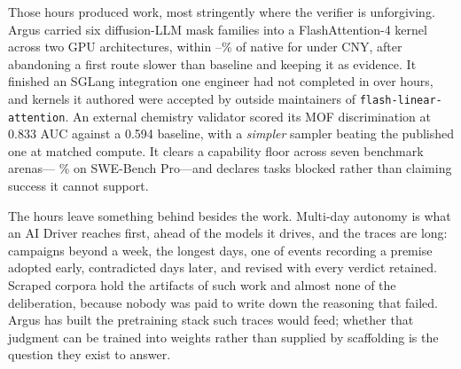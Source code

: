 \documentclass[10pt,letterpaper]{article}
\newcommand{\systemname}{Argus\xspace}
\newcommand{\code}[1]{\texttt{\small #1}}
\begin{document}
\begin{abstractbox}
Those hours produced work, most stringently where the verifier is unforgiving.
\systemname{} carried six diffusion-LLM mask families into a FlashAttention-4 kernel
across two GPU architectures, within \FlashDAGapLow--\FlashDAGapHigh\% of native for
under \FlashDACostCNY{} CNY, after abandoning a first route slower than baseline and
keeping it as evidence. It finished an SGLang integration one engineer had not
completed in over \SGLangHumanHours{} hours, and \FLAPRTotal{} kernels it authored
were accepted by outside maintainers of \code{flash-linear-attention}. An external
chemistry validator scored its MOF discrimination at 0.833 AUC against a 0.594
baseline, with a \emph{simpler} sampler beating the published one at matched
compute. It clears a capability floor across seven benchmark arenas---%
\SWEProArgusAccuracy\% on SWE-Bench Pro---and declares \ReviewerFirstBlocked{} tasks
blocked rather than claiming success it cannot support.

The hours leave something behind besides the work. Multi-day autonomy is what an AI
Driver reaches first, ahead of the models it drives, and the traces are long:
\CampaignsOverWeek{} campaigns beyond a week, the longest \LongestCampaignDays{}
days, one of \LargestTraceEvents{} events recording a premise adopted early,
contradicted days later, and revised with every verdict retained. Scraped corpora
hold the artifacts of such work and almost none of the deliberation, because nobody
was paid to write down the reasoning that failed. \systemname{} has built the
pretraining stack such traces would feed; whether that judgment can be trained into
weights rather than supplied by scaffolding is the question they exist to answer.
\end{abstractbox}


\clearpage
{\hypersetup{linkcolor=ink}
 \renewcommand{\contentsname}{\sffamily Contents}
 \setcounter{tocdepth}{1}
 \tableofcontents}
\clearpage
\end{document}
